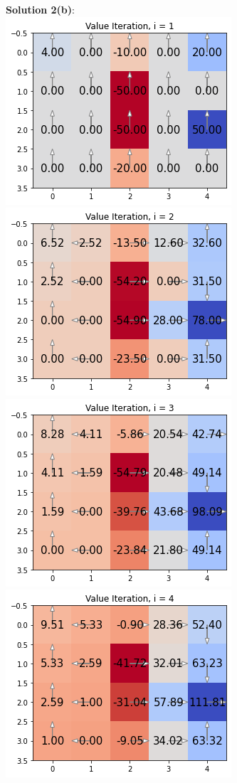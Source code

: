 \documentclass[submit]{harvardml}
\begin{document}
\textbf{Solution 2(b)}:\\
\includegraphics[width=0.5\linewidth]{HW6/plots/2b.1.png}
\includegraphics[width=0.5\linewidth]{HW6/plots/2b.2.png}
\includegraphics[width=0.5\linewidth]{HW6/plots/2b.3.png}
\includegraphics[width=0.5\linewidth]{HW6/plots/2b.4.png}
\newpage
\end{document}
